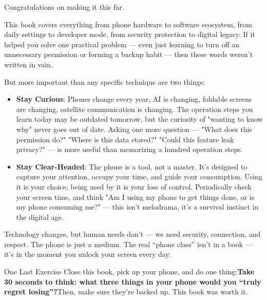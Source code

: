 
Congratulations on making it this far.

This book covers everything from phone hardware to software ecosystem, from daily settings to developer mode, from security protection to digital legacy. If it helped you solve one practical problem — even just learning to turn off an unnecessary permission or forming a backup habit — then these words weren't written in vain.

But more important than any specific technique are two things:

\begin{itemize}
  \item \textbf{Stay Curious}: Phones change every year, AI is changing, foldable screens are changing, satellite communication is changing. The operation steps you learn today may be outdated tomorrow, but the curiosity of "wanting to know why" never goes out of date. Asking one more question — "What does this permission do?" "Where is this data stored?" "Could this feature leak privacy?" — is more useful than memorizing a hundred operation steps.
  \item \textbf{Stay Clear-Headed}: The phone is a tool, not a master. It's designed to capture your attention, occupy your time, and guide your consumption. Using it is your choice; being used by it is your loss of control. Periodically check your screen time, and think "Am I using my phone to get things done, or is my phone consuming me?" — this isn't melodrama, it's a survival instinct in the digital age.
\end{itemize}

Technology changes, but human needs don't — we need security, connection, and respect. The phone is just a medium. The real “phone class” isn't in a book — it's in the moment you unlock your screen every day.

\begin{tcbpractice}{One Last Exercise}
Close this book, pick up your phone, and do one thing:\textbf{Take 30 seconds to think: what three things in your phone would you “truly regret losing”?}Then, make sure they're backed up. This book was worth it.

\end{tcbpractice}
